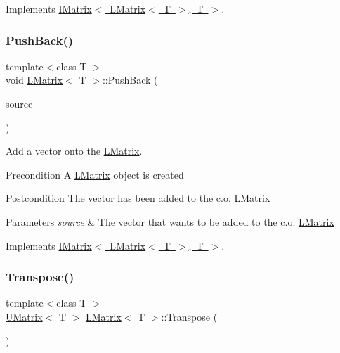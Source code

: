 Implements \mbox{\hyperlink{class_i_matrix_a1ed62ee6700728045083c7f0df3e3e62}{I\+Matrix$<$ L\+Matrix$<$ T $>$, T $>$}}.

\mbox{\label{class_l_matrix_a3f82539f6b2251d49a2e39c7c359b92d}} 
\subsubsection{\texorpdfstring{PushBack()}{PushBack()}}
{\footnotesize\ttfamily template$<$class T $>$ \\
void \mbox{\hyperlink{class_l_matrix}{L\+Matrix}}$<$ T $>$\+::Push\+Back (\begin{DoxyParamCaption}\item[{const \mbox{\hyperlink{class_my_vector}{My\+Vector}}$<$ T $>$ \&}]{source }\end{DoxyParamCaption})\hspace{0.3cm}{\ttfamily [virtual]}}



Add a vector onto the \mbox{\hyperlink{class_l_matrix}{L\+Matrix}}. 

\begin{DoxyPrecond}{Precondition}
A \mbox{\hyperlink{class_l_matrix}{L\+Matrix}} object is created 
\end{DoxyPrecond}
\begin{DoxyPostcond}{Postcondition}
The vector has been added to the c.\+o. \mbox{\hyperlink{class_l_matrix}{L\+Matrix}}
\end{DoxyPostcond}

\begin{DoxyParams}{Parameters}
{\em source} & The vector that wants to be added to the c.\+o. \mbox{\hyperlink{class_l_matrix}{L\+Matrix}} \\
\hline
\end{DoxyParams}


Implements \mbox{\hyperlink{class_i_matrix_aa5de147c7aa5b74b0f2177ed1a8158de}{I\+Matrix$<$ L\+Matrix$<$ T $>$, T $>$}}.

\mbox{\label{class_l_matrix_afe89d1c0c91d284ff0277da586dc667a}} 
\subsubsection{\texorpdfstring{Transpose()}{Transpose()}}
{\footnotesize\ttfamily template$<$class T $>$ \\
\mbox{\hyperlink{class_u_matrix}{U\+Matrix}}$<$ T $>$ \mbox{\hyperlink{class_l_matrix}{L\+Matrix}}$<$ T $>$\+::Transpose (\begin{DoxyParamCaption}{ }\end{DoxyParamCaption})}




